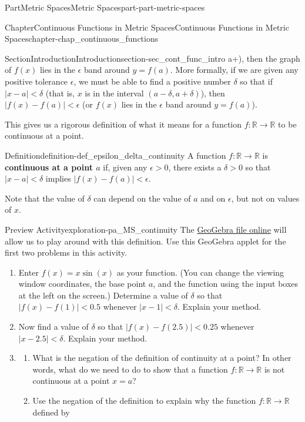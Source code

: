 \documentclass[oneside,10pt,]{book}
\newcommand{\terminology}[1]{\textbf{#1}}
\numberwithin{equation}{chapter}
\newcommand{\R}{\mathbb{R}}
\newcommand{\lt}{<}
\newcommand{\gt}{>}
\begin{document}
\begin{partptx}{Part}{Metric Spaces}{}{Metric Spaces}{}{}{part-part-metric-spaces}
\begin{chapterptx}{Chapter}{Continuous Functions in Metric Spaces}{}{Continuous Functions in Metric Spaces}{}{}{chapter-chap_continuous_functions}
\begin{sectionptx}{Section}{Introduction}{}{Introduction}{}{}{section-sec_cont_func_intro}
a+\delta)\), then the graph of \(f(x)\) lies in the \(\epsilon\) band around \(y=f(a)\). More formally, if we are given any positive tolerance \(\epsilon\), we must be able to find a positive number \(\delta\) so that if \(| x-a | \lt \delta\) (that is, \(x\) is in the interval \((a-\delta, a+\delta)\)), then \(| f(x) - f(a) | \lt \epsilon\) (or \(f(x)\) lies in the \(\epsilon\) band around \(y=f(a)\)).%
\par
This gives us a rigorous definition of what it means for a function \(f: \R \to \R\) to be continuous at a point.%
\begin{definition}{Definition}{}{definition-def_epsilon_delta_continuity}%
A function \(f : \R \to \R\) is \terminology{continuous at a point \(a\)} if, given any \(\epsilon \gt 0\), there exists a \(\delta \gt 0\) so that \(| x - a | \lt \delta\) implies \(| f(x) - f(a)| \lt \epsilon\).%
\end{definition}
Note that the value of \(\delta\) can depend on the value of \(a\) and on \(\epsilon\), but not on values of \(x\).%
\begin{exploration}{Preview Activity}{}{exploration-pa_MS_continuity}%
The \href{https://www.geogebra.org/m/rym36sqs}{GeoGebra file online}\footnotemark{} will allow us to play around with this definition. Use this GeoGebra applet for the first two problems in this activity.%
\begin{enumerate}[font=\bfseries,label=(\alph*),ref=\alph*]%
\item{}Enter \(f(x)=x\sin(x)\) as your function. (You can change the viewing window coordinates, the base point \(a\), and the function using the input boxes at the left on the screen.) Determine a value of \(\delta\) so that \(| f(x) - f(1) | \lt 0.5\) whenever \(| x - 1 | \lt \delta\). Explain your method.%
\item{}Now find a value of \(\delta\) so that \(| f(x) - f(2.5) | \lt 0.25\) whenever \(| x - 2.5 | \lt \delta\). Explain your method.%
\item{}\begin{enumerate}[font=\bfseries,label=(\roman*),ref=\theenumi.\roman*]%
\item{}What is the negation of the definition of continuity at a point? In other words, what do we need to do to show that a function \(f: \R \to \R\) is not continuous at a point \(x=a\)?%
\item{}Use the negation of the definition to explain why the function \(f : \R \to \R\) defined by%
\begin{equation*}

\end{equation*}
\end{enumerate}
\end{enumerate}
\end{exploration}
\end{sectionptx}
\end{chapterptx}
\end{partptx}
\end{document}
